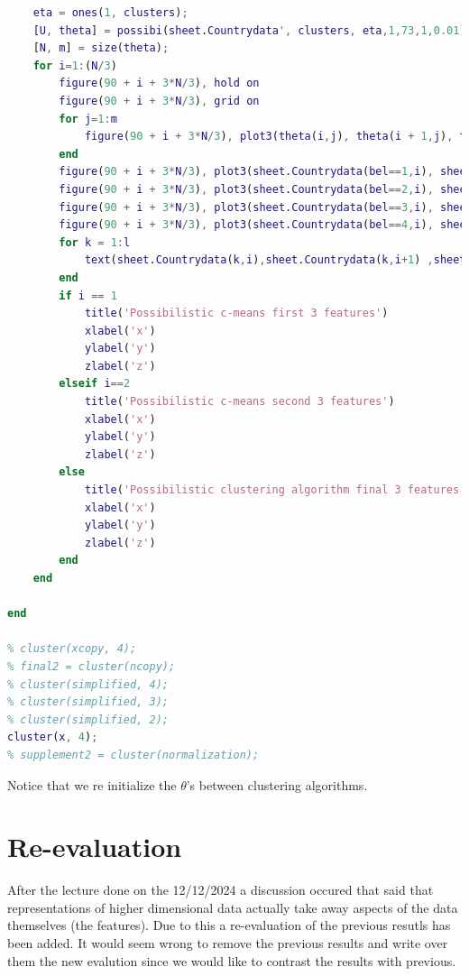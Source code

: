 \documentclass[12pt, a4paper]{article}
\begin{document}
\begin{lstlisting}[language=Matlab, label=lst:final, caption=The entire code as it was upon completion.]
    % Possibilistic
    eta = ones(1, clusters);
    [U, theta] = possibi(sheet.Countrydata', clusters, eta,1,73,1,0.01);
    [N, m] = size(theta);
    for i=1:(N/3)
        figure(90 + i + 3*N/3), hold on
        figure(90 + i + 3*N/3), grid on
        for j=1:m
            figure(90 + i + 3*N/3), plot3(theta(i,j), theta(i + 1,j), theta(i + 2,j), 'k+')
        end
        figure(90 + i + 3*N/3), plot3(sheet.Countrydata(bel==1,i), sheet.Countrydata(bel==1, i+ 1), sheet.Countrydata(bel==1,i+2), 'ro')
        figure(90 + i + 3*N/3), plot3(sheet.Countrydata(bel==2,i), sheet.Countrydata(bel==2, i+ 1), sheet.Countrydata(bel==2,i+2), 'g*')
        figure(90 + i + 3*N/3), plot3(sheet.Countrydata(bel==3,i), sheet.Countrydata(bel==3, i+ 1), sheet.Countrydata(bel==3,i+2), 'b.')
        figure(90 + i + 3*N/3), plot3(sheet.Countrydata(bel==4,i), sheet.Countrydata(bel==4, i+ 1), sheet.Countrydata(bel==4,i+2), 'ys')
        for k = 1:l
            text(sheet.Countrydata(k,i),sheet.Countrydata(k,i+1) ,sheet.Countrydata(k,i+2) , sheet.country(k), 'FontSize', 8, 'HorizontalAlignment', 'left')
        end
        if i == 1
            title('Possibilistic c-means first 3 features')
            xlabel('x')
            ylabel('y')
            zlabel('z')
        elseif i==2
            title('Possibilistic c-means second 3 features')
            xlabel('x')
            ylabel('y')
            zlabel('z')
        else
            title('Possibilistic clustering algorithm final 3 features')
            xlabel('x')
            ylabel('y')
            zlabel('z')
        end
    end

end

% cluster(xcopy, 4);
% final2 = cluster(ncopy);
% cluster(simplified, 4);
% cluster(simplified, 3);
% cluster(simplified, 2);
cluster(x, 4);
% supplement2 = cluster(normalization);
\end{lstlisting}
Notice that we re initialize the $\theta$'s between clustering algorithms.

\section{Re-evaluation}

After the lecture done on the 12/12/2024 a discussion occured that said that representations of higher dimensional data actually take away aspects of the data themselves (the features). Due to this a re-evaluation of the previous resutls has been added. It would seem wrong to remove the previous results and write over them the new evalution since we would like to contrast the results with previous.
\newline
\end{document}

